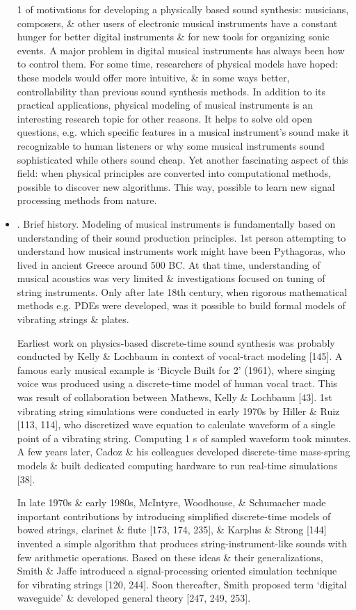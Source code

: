 \documentclass{article}
\begin{document}
\begin{itemize}
	1 of motivations for developing a physically based sound synthesis: musicians, composers, \& other users of electronic musical instruments have a constant hunger for better digital instruments \& for new tools for organizing sonic events. A major problem in digital musical instruments has always been how to control them. For some time, researchers of physical models have hoped: these models would offer more intuitive, \& in some ways better, controllability than previous sound synthesis methods. In addition to its practical applications, physical modeling of musical instruments is an interesting research topic for other reasons. It helps to solve old open questions, e.g. which specific features in a musical instrument's sound make it recognizable to human listeners or why some musical instruments sound sophisticated while others sound cheap. Yet another fascinating aspect of this field: when physical principles are converted into computational methods, possible to discover new algorithms. This way, possible to learn new signal processing methods from nature.
	\item {. Brief history.} Modeling of musical instruments is fundamentally based on understanding of their sound production principles. 1st person attempting to understand how musical instruments work might have been Pythagoras, who lived in ancient Greece around 500 BC. At that time, understanding of musical acoustics was very limited \& investigations focused on tuning of string instruments. Only after late 18th century, when rigorous mathematical methods e.g. PDEs were developed, was it possible to build formal models of vibrating strings \& plates.
	
	Earliest work on physics-based discrete-time sound synthesis was probably conducted by {\sc Kelly \& Lochbaum} in context of vocal-tract modeling [145]. A famous early musical example is `Bicycle Built for 2' (1961), where singing voice was produced using a discrete-time model of human vocal tract. This was result of collaboration between {\sc Mathews, Kelly \& Lochbaum} [43]. 1st vibrating string simulations were conducted in early 1970s by {\sc Hiller \& Ruiz} [113, 114], who discretized wave equation to calculate waveform of a single point of a vibrating string. Computing 1 s of sampled waveform took minutes. A few years later, {\sc Cadoz} \& his colleagues developed discrete-time mass-spring models \& built dedicated computing hardware to run real-time simulations [38].
	
	In late 1970s \& early 1980s, {\sc McIntyre, Woodhouse, \& Schumacher} made important contributions by introducing simplified discrete-time models of bowed strings, clarinet \& flute [173, 174, 235], \& {\sc Karplus \& Strong} [144] invented a simple algorithm that produces string-instrument-like sounds with few arithmetic operations. Based on these ideas \& their generalizations, {\sc Smith \& Jaffe} introduced a signal-processing oriented simulation technique for vibrating strings [120, 244]. Soon thereafter, {\sc Smith} proposed term `digital waveguide' \& developed general theory [247, 249, 253].
	

\end{itemize}
\end{document}
